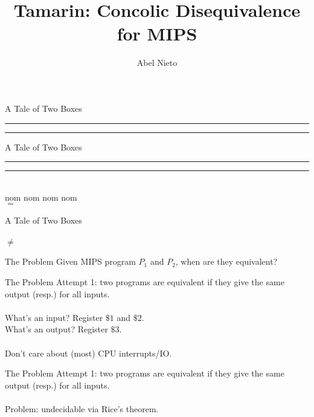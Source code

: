 \documentclass[pdf]{beamer}
\title{Tamarin: Concolic Disequivalence for MIPS}
\author{Abel Nieto}
\date{}
\newcommand{\crule}[3][black]{\textcolor{#1}{\rule{#2}{#3}}}
\begin{document}
\begin{frame}
\titlepage
\end{frame}

\begin{frame}{A Tale of Two Boxes}
~\\
\crule{3cm}{3cm} \hspace{2cm} \crule{3cm}{3cm}
\end{frame}

\begin{frame}{A Tale of Two Boxes}
\hspace{3.5cm}
\\
\crule{3cm}{3cm} \hspace{2cm} \crule{3cm}{3cm}
\pause
\\
nom nom
\pause
\hspace{3.5cm}
nom nom
\pause
\\
\hspace{3.5cm}
{\Huge $=$}
\end{frame}

\begin{frame}{A Tale of Two Boxes}
~\\
 \hspace{2cm} 
\\
\hspace{5cm} {\Huge $\neq$}
\end{frame}

\Large

\begin{frame}{The Problem}
Given MIPS program $P_1$ and $P_2$, when are they equivalent?
\end{frame}

\begin{frame}{The Problem}
Attempt 1: two programs are equivalent if they give the same output (resp.) for all inputs.
\pause
\\~\\
What's an input?
\pause
Register $\$1$ and $\$2$.
\pause
\\
What's an output?
\pause
Register $\$3$. 
\pause
\\~\\
Don't care about (most) CPU interrupts/IO.
\end{frame}

\begin{frame}{The Problem}
Attempt 1: two programs are equivalent if they give the same output (resp.) for all inputs.
\pause
\\~\\
Problem: undecidable via Rice's theorem.
\end{frame}
\end{document}
